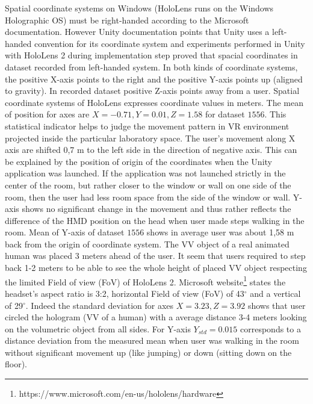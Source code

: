 Spatial coordinate systems on Windows (HoloLens runs on the Windows Holographic OS) must be right-handed according to the Microsoft documentation. However Unity documentation points that Unity uses a left-handed convention for its coordinate system and experiments performed in Unity with HoloLens 2 during implementation step proved that spacial coordinates in dataset recorded from left-handed system. In both kinds of coordinate systems, the positive X-axis points to the right and the positive Y-axis points up (aligned to gravity). In recorded dataset positive Z-axis points away from a user. Spatial coordinate systems of HoloLens expresses coordinate values in meters. The mean of position for axes are $X = - 0.71, Y = 0.01, Z = 1.58$ for dataset $1556$. This statistical indicator helps to judge the movement pattern in VR environment projected inside the particular laboratory space. The user's movement along X axis are shifted 0,7 m to the left side in the direction of negative axis. This can be explained by the position of origin of the coordinates when the Unity application was launched. If the application was not launched strictly in the center of the room, but rather closer to the window or wall on one side of the room, then the user had less room space from the side of the window or wall. Y-axis shows no significant change in the movement and thus rather reflects the difference of the HMD position on the head when user made steps walking in the room. Mean of Y-axis of dataset $1556$ shows in average user was about 1,58 m back from the origin of coordinate system. The VV object of a real animated human was placed 3 meters ahead of the user. It seem that users required to step back 1-2 meters to be able to see the whole height of placed VV object respecting the limited Field of view (FoV) of HoloLens 2. Microsoft website\footnote{https://www.microsoft.com/en-us/hololens/hardware} states the headset’s aspect ratio is 3:2, horizontal Field of view (FoV) of 43$^{\circ}$ and a vertical of 29$^{\circ}$. Indeed the standard deviation for axes $X = 3.23, Z = 3.92$ shows that user circled the hologram (VV of a human) with a average distance 3-4 meters looking on the volumetric object from all sides. For Y-axis $Y_{std} = 0.015$ corresponds to a distance deviation from the measured mean when user was walking in the room without significant movement up (like jumping) or down (sitting down on the floor).



